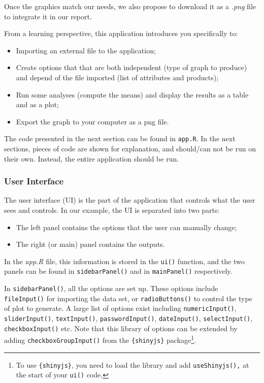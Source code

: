 \documentclass[
]{krantz}
\providecommand{\tightlist}{%
  \setlength{\itemsep}{0pt}\setlength{\parskip}{0pt}}
\renewenvironment{quote}{\begin{VF}}{\end{VF}}
\begin{document}
Once the graphics match our needs, we also propose to download it as a \emph{.png} file to integrate it in our report.

From a learning perspective, this application introduces you specifically to:

\begin{itemize}
\tightlist
\item
  Importing an external file to the application;
\item
  Create options that that are both independent (type of graph to produce) and depend of the file imported (list of attributes and products);
\item
  Run some analyses (compute the means) and display the results as a table and as a plot;
\item
  Export the graph to your computer as a png file.
\end{itemize}

\begin{quote}
The code presented in the next section can be found in \texttt{app.R}. In the next sections, pieces of code are shown for explanation, and should/can not be run on their own. Instead, the entire application should be run.
\end{quote}

\hypertarget{user-interface}{%
\subsubsection*{User Interface}\label{user-interface}}


The user interface (UI) is the part of the application that controls what the user sees and controls.
In our example, the UI is separated into two parts:

\begin{itemize}
\tightlist
\item
  The left panel contains the options that the user can manually change;
\item
  The right (or main) panel contains the outputs.
\end{itemize}

In the \emph{app.R} file, this information is stored in the \texttt{ui()} function, and the two panels can be found in \texttt{sidebarPanel()} and in \texttt{mainPanel()} respectively.

In \texttt{sidebarPanel()}, all the options are set up. These options include \texttt{fileInput()} for importing the data set, or \texttt{radioButtons()} to control the type of plot to generate. A large list of options exist including \texttt{numericInput()}, \texttt{sliderInput()}, \texttt{textInput()}, \texttt{passwordInput()}, \texttt{dateInput()}, \texttt{selectInput()}, \texttt{checkboxInput()} etc. Note that this library of options can be extended by adding \texttt{checkboxGroupInput()} from the \texttt{\{shinyjs\}} package\footnote{To use \texttt{\{shinyjs\}}, you need to load the library and add \texttt{useShinyjs(),} at the start of your \texttt{ui()} code.}.
\end{document}
